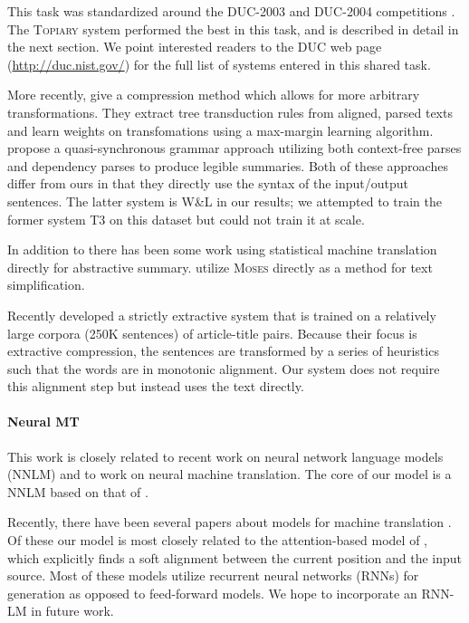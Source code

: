 \documentclass[11pt,a4paper]{article}
\begin{document}
This task was standardized around the DUC-2003 and DUC-2004
competitions \cite{over2007duc}. The \textsc{Topiary} system
\cite{zajic2004bbn} performed the best in this task, and is described in
detail in the next section.  We point interested readers to the
DUC web page (\url{http://duc.nist.gov/}) for the full list of systems
entered in this shared task.

More recently,  give a compression method
which allows for more arbitrary transformations. They extract tree
transduction rules from aligned, parsed texts and learn weights on
transfomations using a max-margin learning
algorithm.  propose a
quasi-synchronous grammar approach utilizing both
context-free parses and dependency parses to produce legible
summaries. Both of these approaches differ from ours in that they
directly use the syntax of the input/output sentences.  The latter
system is \textsc{W\&L} in our results; we attempted to train the
former system \textsc{T3} on this dataset but could not train it at
scale.



In addition to  there has been some work
using  statistical machine translation directly for abstractive
summary.  utilize \textsc{Moses} directly
as a method for text simplification.

Recently  developed a strictly
extractive system that is trained on a relatively large corpora (250K
sentences) of article-title pairs. Because their
focus is extractive compression, the sentences are
transformed by a series of heuristics such that the words are in
monotonic alignment. Our system does not require this alignment step
but instead uses the text directly. 

\paragraph{Neural MT}

This work is closely related to recent work on neural network language
models (NNLM) and to work on neural machine translation. The core of
our model is a NNLM based on that of .

Recently, there have been several papers about models for machine
translation
\cite{kalchbrenner2013recurrent,cho2014learning,sutskever2014sequence}. Of
these our model is most closely related to the attention-based model
of , which explicitly finds a soft
alignment between the current position and the input source. Most of
these models utilize recurrent neural networks (RNNs) for generation
as opposed to feed-forward models. We hope to incorporate an RNN-LM 
in future work. 
\end{document}
